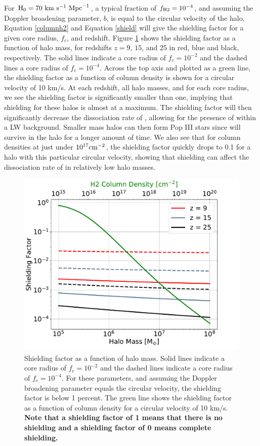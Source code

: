 \documentclass[fleqn,usenatbib]{mnras}
\begin{document}
For $\rm{H}_{0} = 70 \ \rm{km} \ \rm{s}^{-1} \ \rm{Mpc}^{-1}$, a typical \hh{} fraction of $f_{\rm H2} = 10^{-4}$, and assuming the Doppler broadening parameter, $b$, is equal to the circular velocity of the halo, Equation \ref{columnh2} and Equation \ref{shield} will give the shielding factor for a given core radius, $f_{c}$, and redshift. Figure \ref{fig:shield_mass} shows the shielding factor as a function of halo mass, for redshifts $z = 9$, $15$, and $25$ in red, blue and black, respectively. The solid lines indicate a core radius of $f_{c} = 10^{-2}$ and the dashed lines a core radius of $f_{c} = 10^{-4}$. Across the top axis and plotted as a green line, the shielding factor as a function of \hh{} column density is shown for a circular velocity of 10 km/s. At each redshift, all halo masses, and for each core radius, we see the shielding factor is significantly smaller than one, implying that \hh{} shielding for these halos is almost at a maximum. The shielding factor will then significantly decrease the dissociation rate of \hh{}, allowing for the presence of \hh{} within a LW background. Smaller mass halos can then form Pop III stars since \hh{} will survive in the halo for a longer amount of time. We also see that for column densities at just under $10^{17} \rm cm^{-2}$, the shielding factor quickly drops to 0.1 for a halo with this particular circular velocity, showing that \hh{} shielding can affect the dissociation rate of \hh{} in relatively low halo masses.

\begin{figure}
	\includegraphics[width=\columnwidth]{images/shield_mass.pdf}
    \caption{Shielding factor as a function of halo mass. Solid lines indicate a core radius of $f_{c} = 10^{-2}$ and the dashed lines indicate a core radius of $f_{c} = 10^{-4}$. For these parameters, and assuming the Doppler broadening parameter equals the circular velocity, the shielding factor is below 1 percent. The green line shows the shielding factor as a function of \hh{} column density for a circular velocity of 10 km/s. \textbf{Note that a shielding factor of 1 means that there is no shielding and a shielding factor of 0 means complete shielding.}}
    \label{fig:shield_mass}
\end{figure}
\end{document}
